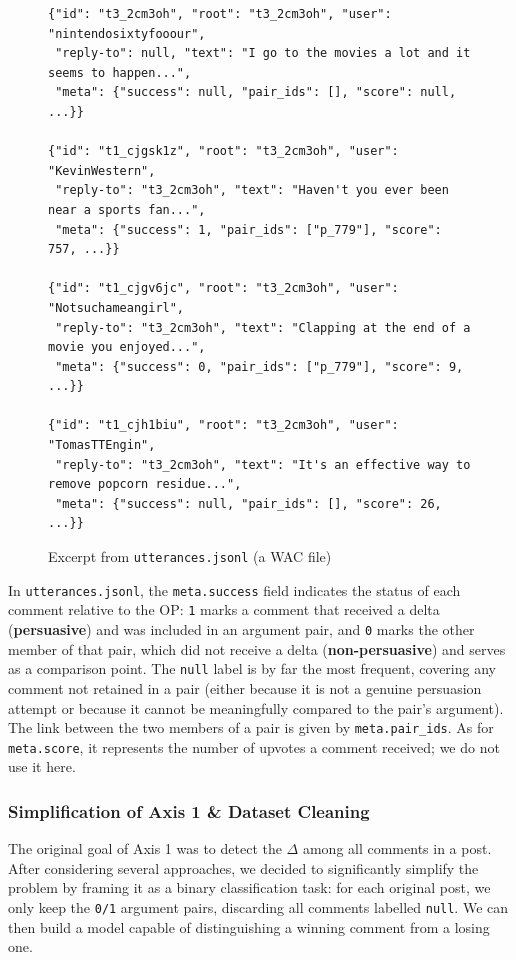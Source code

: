 \documentclass[11pt,a4paper]{article}
\begin{document}
\vspace{0.3cm}

\begin{figure}[H]
\begin{lstlisting}[basicstyle=\ttfamily\scriptsize, breaklines=true, frame=single]
{"id": "t3_2cm3oh", "root": "t3_2cm3oh", "user": "nintendosixtyfooour",
 "reply-to": null, "text": "I go to the movies a lot and it seems to happen...",
 "meta": {"success": null, "pair_ids": [], "score": null, ...}}

{"id": "t1_cjgsk1z", "root": "t3_2cm3oh", "user": "KevinWestern",
 "reply-to": "t3_2cm3oh", "text": "Haven't you ever been near a sports fan...",
 "meta": {"success": 1, "pair_ids": ["p_779"], "score": 757, ...}}

{"id": "t1_cjgv6jc", "root": "t3_2cm3oh", "user": "Notsuchameangirl",
 "reply-to": "t3_2cm3oh", "text": "Clapping at the end of a movie you enjoyed...",
 "meta": {"success": 0, "pair_ids": ["p_779"], "score": 9, ...}}

{"id": "t1_cjh1biu", "root": "t3_2cm3oh", "user": "TomasTTEngin",
 "reply-to": "t3_2cm3oh", "text": "It's an effective way to remove popcorn residue...",
 "meta": {"success": null, "pair_ids": [], "score": 26, ...}}
\end{lstlisting}
\caption{Excerpt from \texttt{utterances.jsonl} (a WAC file)}
\label{fig:wac-example}
\end{figure}

In \texttt{utterances.jsonl}, the \texttt{meta.success} field indicates the
status of each comment relative to the OP: \texttt{1} marks a comment that
received a delta (\textbf{persuasive}) and was included in an argument pair,
and \texttt{0} marks the other member of that pair, which did not receive a
delta (\textbf{non-persuasive}) and serves as a comparison point. The
\texttt{null} label is by far the most frequent, covering any comment not
retained in a pair (either because it is not a genuine persuasion attempt or
because it cannot be meaningfully compared to the pair's argument). The link
between the two members of a pair is given by \texttt{meta.pair\_ids}. As for
\texttt{meta.score}, it represents the number of upvotes a comment received;
we do not use it here.

\subsubsection{Simplification of Axis 1 \& Dataset Cleaning}

The original goal of Axis 1 was to detect the $\Delta$ among all comments in
a post. After considering several approaches, we decided to significantly
simplify the problem by framing it as a binary classification task: for each
original post, we only keep the \texttt{0/1} argument pairs, discarding all
comments labelled \texttt{null}. We can then build a model capable of
distinguishing a winning comment from a losing one.\\
\end{document}
